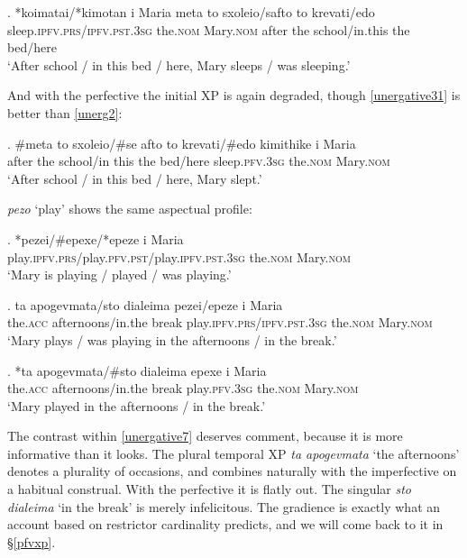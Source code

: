 \documentclass[11pt]{article}
\newcommand{\pfv}{\textsc{pfv}\xspace}
\newcommand{\ipfv}{\textsc{ipfv}\xspace}
\begin{document}
\exg. *koimatai/*kimotan i Maria meta to sxoleio/safto to krevati/edo\\
sleep.\ipfv.\textsc{prs}/\ipfv.\textsc{pst}.3\textsc{sg} the.\textsc{nom} Mary.\textsc{nom} after the school/in.this the bed/here\\ \label{unergative36}
`After school / in this bed / here, Mary sleeps / was sleeping.'

And with the perfective the initial XP is again degraded, though \ref{unergative31} is better than \ref{unerg2}:

\exg. \#meta to sxoleio/\#se afto to krevati/\#edo kimithike i Maria\\
after the school/in this the bed/here sleep.\pfv.3\textsc{sg} the.\textsc{nom} Mary.\textsc{nom}\\ \label{unergative31}
`After school / in this bed / here, Mary slept.'

\emph{pezo} `play' shows the same aspectual profile:

\exg. *pezei/\#epexe/*epeze i Maria\\
play.\ipfv.\textsc{prs}/play.\pfv.\textsc{pst}/play.\ipfv.\textsc{pst}.3\textsc{sg} the.\textsc{nom} Mary.\textsc{nom}\\ \label{unergative5}
`Mary is playing / played / was playing.'

\exg. ta apogevmata/sto dialeima pezei/epeze i Maria\\
the.\textsc{acc} afternoons/in.the break play.\ipfv.\textsc{prs}/\ipfv.\textsc{pst}.3\textsc{sg} the.\textsc{nom} Mary.\textsc{nom}\\ \label{unergative6}
`Mary plays / was playing in the afternoons / in the break.'

\exg. *ta apogevmata/\#sto dialeima epexe i Maria\\
the.\textsc{acc} afternoons/in.the break play.\pfv.3\textsc{sg} the.\textsc{nom} Mary.\textsc{nom}\\ \label{unergative7}
`Mary played in the afternoons / in the break.'

The contrast within \ref{unergative7} deserves comment, because it is more informative than it looks.  The plural temporal XP \emph{ta apogevmata} `the afternoons' denotes a plurality of occasions, and combines naturally with the imperfective on a habitual construal.  With the perfective it is flatly out.  The singular \emph{sto dialeima} `in the break' is merely infelicitous.  The gradience is exactly what an account based on restrictor cardinality predicts, and we will come back to it in \S\ref{pfvxp}.
\end{document}
